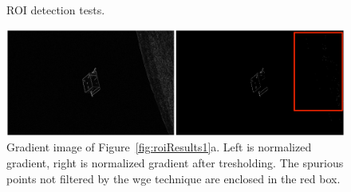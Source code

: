 \begin{figure}[htpb]
  \qquad
  \qquad
  \qquad
  \qquad
  \caption{ROI detection tests.}
  \label{fig:roiResults2}
\end{figure}

\begin{figure}[htpb]
  \centering
  \includegraphics[width=1.0\textwidth]{gfx/results/prisma/101/8Select.png}
  \caption{Gradient image of Figure~\ref{fig:roiResults1}a. Left is normalized gradient, right is normalized gradient after tresholding. The spurious points not filtered by the \acrshort{wge} technique are enclosed in the red box.}
\end{figure}

